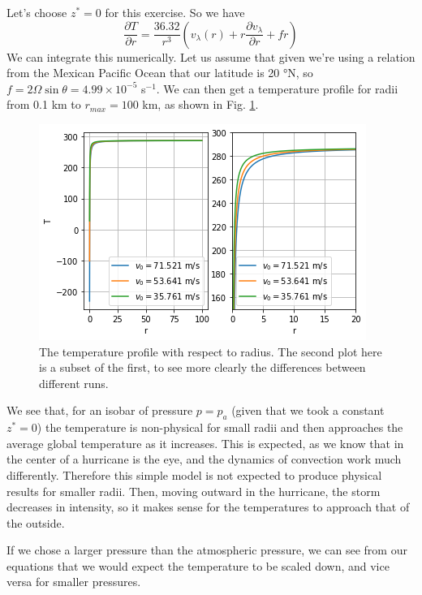 Let's choose $z^*=0$ for this exercise. So we have 
\begin{equation*}
    \frac{\partial T}{\partial r} = \frac{36.32}{r^3}(v_{\lambda}(r)+r\frac{\partial v_{\lambda}}{\partial r}+fr)
\end{equation*}
We can integrate this numerically. Let us assume that given we're using a relation from the Mexican Pacific Ocean that our latitude is 20 °N, so $f=2\Omega \sin\theta=4.99\times10^{-5}$ s$^{-1}$. We can then get a temperature profile for radii from 0.1 km to $r_{max}=100$ km, as shown in Fig. \ref{fig:Tplot}.

\begin{figure}
    \centering
    \includegraphics[width=\linewidth]{assets/Tplot.png}
    \caption{The temperature profile with respect to radius. The second plot here is a subset of the first, to see more clearly the differences between different runs.}
    \label{fig:Tplot}
\end{figure}

We see that, for an isobar of pressure $p=p_a$ (given that we took a constant $z^*=0$) the temperature is non-physical for small radii and then approaches the average global temperature as it increases. This is expected, as we know that in the center of a hurricane is the eye, and the dynamics of convection work much differently. Therefore this simple model is not expected to produce physical results for smaller radii. Then, moving outward in the hurricane, the storm decreases in intensity, so it makes sense for the temperatures to approach that of the outside. 

If we chose a larger pressure than the atmospheric pressure, we can see from our equations that we would expect the temperature to be scaled down, and vice versa for smaller pressures. 